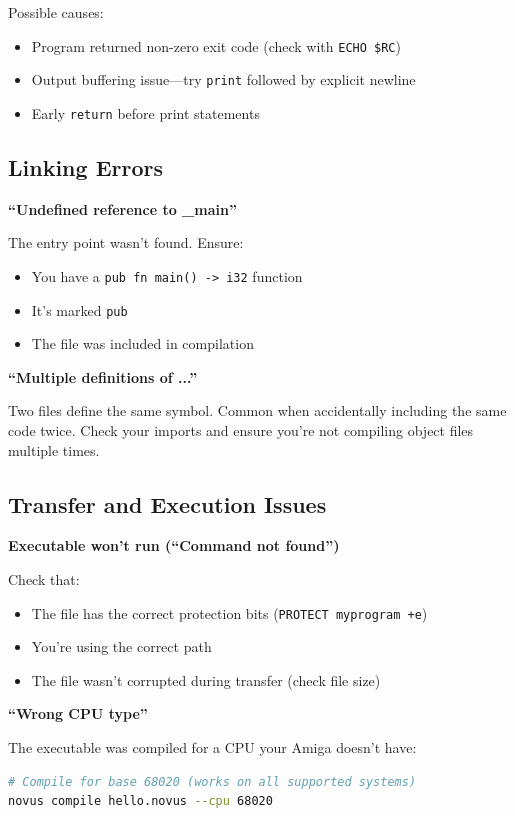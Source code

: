 Possible causes:
\begin{itemize}
    \item Program returned non-zero exit code (check with \texttt{ECHO \$RC})
    \item Output buffering issue---try \texttt{print} followed by explicit newline
    \item Early \texttt{return} before print statements
\end{itemize}

\subsection{Linking Errors}

\textbf{``Undefined reference to \_main''}

The entry point wasn't found. Ensure:
\begin{itemize}
    \item You have a \texttt{pub fn main() -> i32} function
    \item It's marked \texttt{pub}
    \item The file was included in compilation
\end{itemize}

\textbf{``Multiple definitions of ...''}

Two files define the same symbol. Common when accidentally including the same code twice. Check your imports and ensure you're not compiling object files multiple times.

\subsection{Transfer and Execution Issues}

\textbf{Executable won't run (``Command not found'')}

Check that:
\begin{itemize}
    \item The file has the correct protection bits (\texttt{PROTECT myprogram +e})
    \item You're using the correct path
    \item The file wasn't corrupted during transfer (check file size)
\end{itemize}

\textbf{``Wrong CPU type''}

The executable was compiled for a CPU your Amiga doesn't have:
\begin{lstlisting}[language=bash]
# Compile for base 68020 (works on all supported systems)
novus compile hello.novus --cpu 68020
\end{lstlisting}

